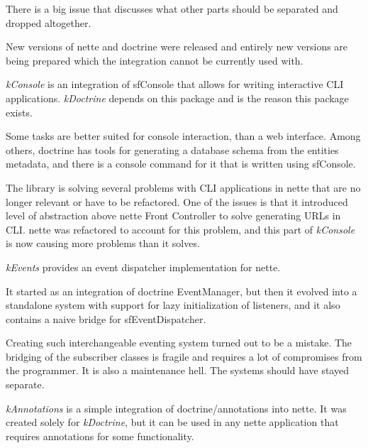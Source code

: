 There is a big issue  that discusses what other parts should be separated and dropped altogether.

New versions of \gls{nette} and \gls{doctrine} were released and entirely new versions are being prepared which the integration cannot be currently used with.

 \label{sec:state:console}

\textit{\gls{kConsole}} is an integration of \gls{sfConsole} that allows for writing interactive CLI applications. \textit{\gls{kDoctrine}} depends on this package and is the reason this package exists.

Some tasks are better suited for console interaction, than a web interface. Among others, \gls{doctrine} has tools for generating a database schema from the entities metadata, and there is a console command for it that is written using \gls{sfConsole}.

The library is solving several problems with CLI applications in \gls{nette} that are no longer relevant or have to be refactored. One of the issues is that it introduced level of abstraction above \gls{nette} Front Controller to solve generating URLs in CLI. \gls{nette} was refactored to account for this problem, and this part of \textit{\gls{kConsole}} is now causing more problems than it solves.

 \label{sec:state:events}

\textit{\gls{kEvents}} provides an event dispatcher implementation for \gls{nette}.

It started as an integration of \gls{doctrine} EventManager, but then it evolved into a standalone system with support for lazy initialization of listeners, and it also contains a naive bridge for \gls{sfEventDispatcher}.

Creating such interchangeable eventing system turned out to be a mistake. The bridging of the subscriber classes is fragile and requires a lot of compromises from the programmer. It is also a maintenance hell. The systems should have stayed separate.

 \label{sec:state:annotations}

\textit{\gls{kAnnotations}} is a simple integration of doctrine/annotations into \gls{nette}. It was created solely for \textit{\gls{kDoctrine}}, but it can be used in any \gls{nette} application that requires annotations for some functionality.

